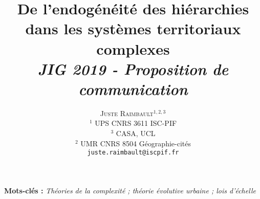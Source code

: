 \documentclass[11pt]{article}
\newcommand{\noun}[1]{\textsc{#1}}
\begin{document}
\title{\vspace{-1cm}De l'endogénéité des hiérarchies dans les systèmes territoriaux complexes
\\\medskip
\textit{JIG 2019 - Proposition de communication}
}
\author{\noun{Juste Raimbault}$^{1,2,3}$\medskip\\
$^1$ UPS CNRS 3611 ISC-PIF\\
$^3$ CASA, UCL\\
$^2$ UMR CNRS 8504 G{\'e}ographie-cit{\'e}s\medskip\\
\texttt{juste.raimbault@iscpif.fr}
}
\date{}

\maketitle

\justify



\textbf{Mots-clés : }\textit{Théories de la complexité ; théorie évolutive urbaine ; lois d'échelle}

\medskip
\end{document}
